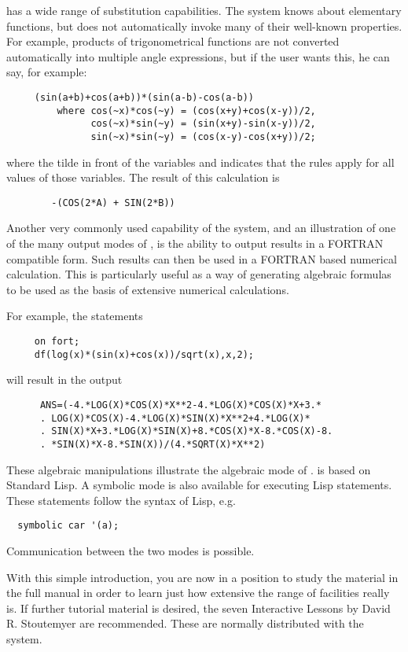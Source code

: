 {\REDUCE} has a wide range of substitution capabilities. The system knows
about elementary functions, but does not automatically invoke many of their
well-known properties. For example, products of trigonometrical functions
are not converted automatically into multiple angle expressions, but if the
user wants this, he can say, for example:
\begin{verbatim}
     (sin(a+b)+cos(a+b))*(sin(a-b)-cos(a-b))
         where cos(~x)*cos(~y) = (cos(x+y)+cos(x-y))/2,
               cos(~x)*sin(~y) = (sin(x+y)-sin(x-y))/2,
               sin(~x)*sin(~y) = (cos(x-y)-cos(x+y))/2;
\end{verbatim}
where the tilde in front of the variables  and  indicates
that the rules apply for all values of those variables.
The result of this calculation is
\begin{verbatim}
        -(COS(2*A) + SIN(2*B))
\end{verbatim}

Another very commonly used capability of the system, and an illustration
of one of the many output modes of {\REDUCE}, is the ability to output
results in a FORTRAN compatible form.  Such results can then be used in a
FORTRAN based numerical calculation.  This is particularly useful as a way
of generating algebraic formulas to be used as the basis of extensive
numerical calculations.

For example, the statements
\begin{verbatim}
     on fort;
     df(log(x)*(sin(x)+cos(x))/sqrt(x),x,2);
\end{verbatim}
will result in the output
\begin{verbatim}
      ANS=(-4.*LOG(X)*COS(X)*X**2-4.*LOG(X)*COS(X)*X+3.*
      . LOG(X)*COS(X)-4.*LOG(X)*SIN(X)*X**2+4.*LOG(X)*
      . SIN(X)*X+3.*LOG(X)*SIN(X)+8.*COS(X)*X-8.*COS(X)-8.
      . *SIN(X)*X-8.*SIN(X))/(4.*SQRT(X)*X**2)
\end{verbatim}
These algebraic manipulations illustrate the algebraic mode of {\REDUCE}.
{\REDUCE} is based on Standard Lisp. A symbolic mode is also available for
executing Lisp statements. These statements follow the syntax of Lisp,
e.g.
\begin{verbatim}
  symbolic car '(a);
\end{verbatim}
Communication between the two modes is possible.

With this simple introduction, you are now in a position to study the
material in the full {\REDUCE} manual in order to learn just how extensive
the range of facilities really is.  If further tutorial material is
desired, the seven {\REDUCE} Interactive Lessons by David R. Stoutemyer are
recommended.  These are normally distributed with the system.

